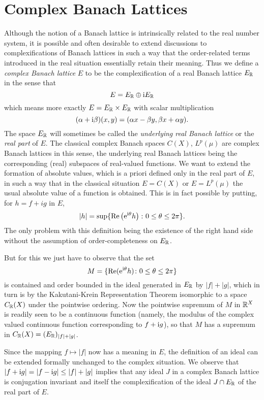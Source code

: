 \section{Complex Banach Lattices}\label{sec:c1-7}%
Although the notion of a Banach lattice is intrinsically related to the real number system, it is possible and often desirable to extend discussions to complexifications of Banach lattices in such a way that the order-related terms introduced in the real situation essentially retain their meaning.
Thus we define a \emph{complex Banach lattice} $ E $ to be the complexification of a real Banach lattice $ E_{\mathbb{R}} $ in the sense that
\[
E = E_{\mathbb{R}} \oplus \mathrm{i} E_{\mathbb{R}}
\]
which means more exactly $ E = E_{\mathbb{R}} \times E_{\mathbb{R}} $ with scalar multiplication 
%
\[
	 (\alpha+\mathrm{i}\beta)(x,y) = (\alpha x-\beta y,\beta x+\alpha y)  .
\]
%
The space $ E_{\mathbb{R}} $ will sometimes be called the \emph{underlying real Banach lattice} or the \emph{real part} of $ E $.
The classical complex Banach spaces $ C(X) $, $ L^{p}(\mu) $ are complex Banach lattices in this sense, the underlying real Banach lattices being the corresponding (real) subspaces of real-valued functions.
We want to extend the formation of absolute values, which is a priori defined only in the real part of $ E $, in such a way that in the classical situation $ E = C(X) $ or $ E = L^{p}(\mu) $ the usual absolute value of a function is obtained.
This is in fact possible by putting, for $ h = f + ig $ in $ E $,
\[
	|h| = \sup\{ \mathrm{Re} \left(  \mathrm{e}^{\mathrm{i}\theta}h \right) \colon 0 \leq \theta \leq 2\pi \}.
\]
The only problem with this definition being the existence of the right hand side without the assumption of order-completeness on $ E_{\mathbb{R}} $.

But for this we just have to observe that the set 
\[
M = \{\mathop{}\!\mathrm{Re}( \mathrm{e}^{\mathrm{i}\theta}h) \colon 0 \leq \theta \leq 2\pi\}
\]
is contained and order bounded in the ideal generated in $ E_{\mathbb{R}} $ by $ |f| + |g| $, which in turn is by the Kakutani-Krein Representation Theorem isomorphic to a space $ C_{\mathbb{R}}(X) $ under the pointwise ordering.
Now the pointwise supremum of $ M $ in $ \mathbb{R}^{X} $ is readily seen to be a continuous function (namely, the modulus of the complex valued continuous function corresponding to $ f + \mathrm{i} g $), so that $ M $ has a supremum in $ C_{\mathbb{R}}(X) = (E_{\mathbb{R}})_{|f|+|g|} $.

Since the mapping $ f \mapsto |f| $ now has a meaning in $ E $, the definition of an ideal can be extended formally unchanged to the complex situation.
We observe that $ |f+ \mathrm{i} g| = |f- \mathrm{i} g| \leq |f|+|g| $ implies that any ideal $ J $ in a complex Banach lattice is conjugation invariant and itself the complexification of the ideal $ J \cap E_{\mathbb{R}} $ of the real part of $ E $.

